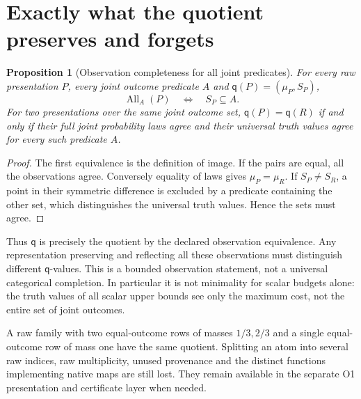 \documentclass[11pt,a4paper]{article}
\newtheorem{proposition}[theorem]{Proposition}
\theoremstyle{definition}
\newcommand{\All}{\operatorname{All}}
\newcommand{\qobs}{\mathsf{q}}
\begin{document}
\section{Exactly what the quotient preserves and forgets}\label{sec:information}
\begin{proposition}[Observation completeness for all joint predicates]
\label{prop:predicates}
For every raw presentation $P$, every joint outcome predicate $A$ and
$\qobs(P)=(\mu_P,S_P)$,
\[
 \All_A(P)\quad\Longleftrightarrow\quad S_P\subseteq A.
\]
For two presentations over the same joint outcome set, $\qobs(P)=\qobs(R)$ if
and only if their full joint probability laws agree and their universal
truth values agree for every such predicate $A$.
\end{proposition}
\begin{proof}
The first equivalence is the definition of image. If the pairs are
equal, all the observations agree. Conversely equality of laws gives
$\mu_P=\mu_R$. If $S_P\neq S_R$, a point in their symmetric difference
is excluded by a predicate containing the other set, which distinguishes
the universal truth values. Hence the sets must agree.
\end{proof}
Thus $\qobs$ is precisely the quotient by the declared observation
equivalence. Any representation preserving and reflecting all these
observations must distinguish different $\qobs$-values. This is a bounded
observation statement, not a universal categorical completion. In
particular it is not minimality for scalar budgets alone: the truth
values of all scalar upper bounds see only the maximum cost, not the
entire set of joint outcomes.

A raw family with two equal-outcome rows of masses $1/3,2/3$ and a
single equal-outcome row of mass one have the same quotient. Splitting
an atom into several raw indices, raw multiplicity, unused provenance
and the distinct functions implementing native maps are still lost.
They remain available in the separate O1 presentation and certificate
layer when needed.
\end{document}
